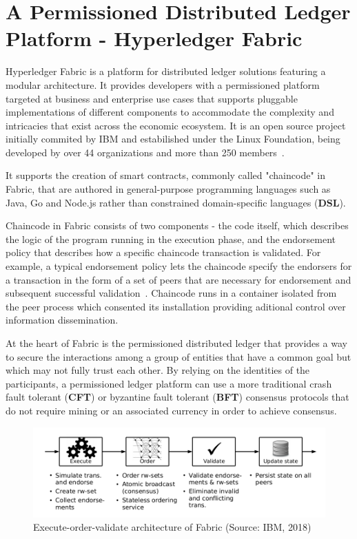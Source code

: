 \section{A Permissioned Distributed Ledger Platform - Hyperledger Fabric}
\label{distributedLedgerPlatform}

Hyperledger Fabric is a platform for distributed ledger solutions featuring a
modular architecture. It provides developers with a permissioned platform
targeted at business and enterprise use cases that supports pluggable
implementations of different components to accommodate the complexity and
intricacies that exist across the economic ecosystem. It is an open source
project initially commited by IBM  and estabilished under the Linux Foundation,
being developed by over 44 organizations and more than 250
members~\cite{HyperledgerFabricDocs2017,HyperledgerGrowth2018}.

It supports the creation of smart contracts, commonly called "chaincode" in
Fabric, that are authored in general-purpose programming languages such as
Java, Go and Node.js rather than constrained domain-specific languages
(\textbf{DSL}). 

Chaincode in Fabric consists of two components - the code itself, which
describes the logic of the program running in the execution phase, and the
endorsement policy that describes how a specific chaincode transaction is
validated. For example, a typical endorsement policy lets the chaincode specify
the endorsers for a transaction in the form of a set of peers that are
necessary for endorsement and subsequent successful
validation~\cite{Androulaki2018}. Chaincode runs in a container isolated from
the peer process which consented its installation providing aditional control
over information dissemination.

At the heart of Fabric is the permissioned distributed ledger that provides a
way to secure the interactions among a group of entities that have a common
goal but which may not fully trust each other. By relying on the identities of
the participants, a permissioned ledger platform can use a more traditional
crash fault tolerant (\textbf{CFT}) or byzantine fault tolerant (\textbf{BFT})
consensus protocols that do not require mining or an associated currency in
order to achieve consensus.

\begin{figure}[h]
  \centering
  \includegraphics[width=1\linewidth]{imgs/executeOrderValidate.png}
  \caption{\label{fig:executeorder} Execute-order-validate architecture of
  Fabric (Source: IBM, 2018)}
\end{figure}

